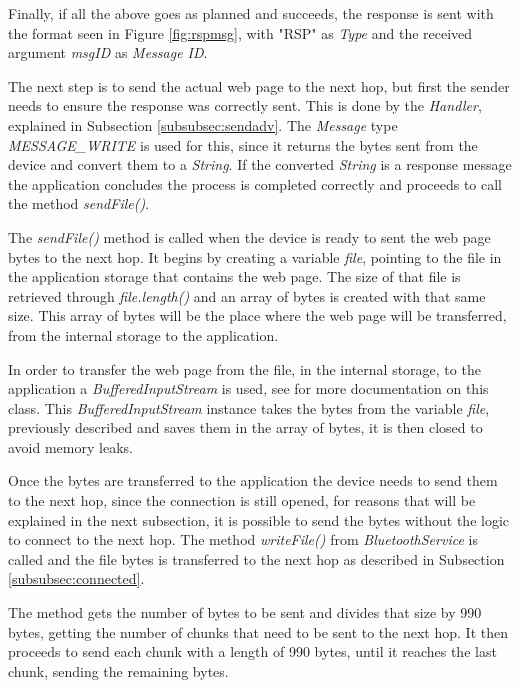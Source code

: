 Finally, if all the above goes as planned and succeeds, the response is sent with the format seen in Figure \ref{fig:rspmsg}, with "RSP" as \textit{Type} and the received argument \textit{msgID} as \textit{Message ID}.

The next step is to send the actual web page to the next hop, but first the sender needs to ensure the response was correctly sent. This is done by the \textit{Handler}, explained in Subsection \ref{subsubsec:sendadv}. The \textit{Message} type \textit{MESSAGE\_WRITE} is used for this, since it returns the bytes sent from the device and convert them to a \textit{String}. If the converted \textit{String} is a response message the application concludes the process is completed correctly and proceeds to call the method \textit{sendFile()}.

The \textit{sendFile()} method is called when the device is ready to sent the web page bytes to the next hop. It begins by creating a variable \textit{file}, pointing to the file in the application storage that contains the web page. The size of that file is retrieved through \textit{file.length()} and an array of bytes is created with that same size. This array of bytes will be the place where the web page will be transferred, from the internal storage to the application.

In order to transfer the web page from the file, in the internal storage, to the application a \textit{BufferedInputStream} is used, see \cite{bis} for more documentation on this class. This \textit{BufferedInputStream} instance takes the bytes from the variable \textit{file}, previously described and saves them in the array of bytes, it is then closed to avoid memory leaks.

Once the bytes are transferred to the application the device needs to send them to the next hop, since the connection is still opened, for reasons that will be explained in the next subsection, it is possible to send the bytes without the logic to connect to the next hop. The method \textit{writeFile()} from \textit{BluetoothService} is called and the file bytes is transferred to the next hop as described in Subsection \ref{subsubsec:connected}.

The method gets the number of bytes to be sent and divides that size by 990 bytes, getting the number of chunks that need to be sent to the next hop. It then proceeds to send each chunk with a length of 990 bytes, until it reaches the last chunk, sending the remaining bytes.

